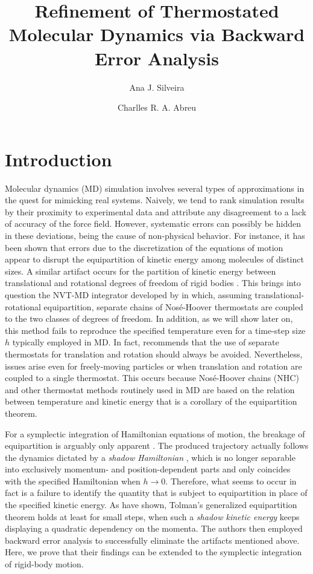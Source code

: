 \documentclass[
journal=jctcce,
layout=twocolumn
]{achemso}
\author{Ana J. Silveira}
\affiliation{Planta Piloto de Ingenier\'ia Qu\'imica, PLAPIQUI, Universidad Nacional del Sur, Camino La Carrindanga Km 7-CC: 717, Bah\'ia Blanca, Argentina}
\author{Charlles R. A. Abreu}
\affiliation{Chemical Engineering Department, Escola de Qu\'imica, Universidade Federal do Rio de Janeiro, Rio de Janeiro, RJ 21941-909, Brazil}
\title{Refinement of Thermostated Molecular Dynamics via Backward Error Analysis}
\newcommand{\timestep}{h}
\begin{document}


\section{Introduction}

Molecular dynamics (MD) simulation involves several types of approximations in the quest for mimicking real systems.
Naively, we tend to rank simulation results by their proximity to experimental data and attribute any disagreement to a lack of accuracy of the force field.
However, systematic errors can possibly be hidden in these deviations, being the cause of non-physical behavior.
For instance, it has been shown \cite{Eastwood_2010} that errors due to the discretization of the equations of motion appear to disrupt the equipartition of kinetic energy among molecules of distinct sizes.
A similar artifact occurs for the partition of kinetic energy between translational and rotational degrees of freedom of rigid bodies \cite{Davidchack_2010, Silveira_2017}.
This brings into question the NVT-MD integrator developed by \citeauthor{Kamberaj_2005} \cite{Kamberaj_2005} in which, assuming translational-rotational equipartition, separate chains of Nos\'{e}-Hoover thermostats are coupled to the two classes of degrees of freedom.
In addition, as we will show later on, this method fails to reproduce the specified temperature even for a time-step size $\timestep$ typically employed in MD.
In fact, \citeauthor{Davidchack_2010} \cite{Davidchack_2010} recommends that the use of separate thermostats for translation and rotation should always be avoided.
Nevertheless, issues arise even for freely-moving particles or when translation and rotation are coupled to a single thermostat.
This occurs because Nos\'{e}-Hoover chains (NHC) \cite{Martyna_1992} and other thermostat methods routinely used in MD are based on the relation between temperature and kinetic energy that is a corollary of the equipartition theorem.

For a symplectic integration of Hamiltonian equations of motion, the breakage of equipartition is arguably only apparent \cite{Eastwood_2010}.
The produced trajectory actually follows the dynamics dictated by a \textit{shadow Hamiltonian} \cite{Tuckerman_2010}, which is no longer separable into exclusively momentum- and position-dependent parts and only coincides with the specified Hamiltonian when $\timestep \to 0$.
Therefore, what seems to occur in fact is a failure to identify the quantity that is subject to equipartition in place of the specified kinetic energy.
As \citeauthor{Eastwood_2010} \cite{Eastwood_2010} have shown, Tolman's generalized equipartition theorem \cite{Tolman_1918} holds at least for small steps, when such a \textit{shadow kinetic energy} keeps displaying a quadratic dependency on the momenta.
The authors then employed backward error analysis to successfully eliminate the artifacts mentioned above.
Here, we prove that their findings can be extended to the symplectic integration of rigid-body motion.
\end{document}
